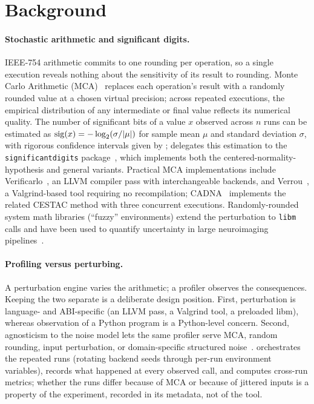 \section{Background}
\label{sec:background}

\paragraph{Stochastic arithmetic and significant digits.}
IEEE-754 arithmetic commits to one rounding per operation, so a single
execution reveals nothing about the sensitivity of its result to rounding.
Monte Carlo Arithmetic (MCA)~\citep{parker1997monte} replaces each
operation's result with a randomly rounded value at a chosen virtual
precision; across repeated executions, the empirical distribution of any
intermediate or final value reflects its numerical quality. The number of
significant bits of a value $x$ observed across $n$ runs can be estimated
as $\operatorname{sig}(x) = -\log_2\!\left(\sigma / |\mu|\right)$ for sample mean $\mu$
and standard deviation $\sigma$, with rigorous confidence intervals given
by \citet{sohier2021confidence}; \pyt{} delegates this estimation to the
\texttt{significantdigits} package~\citep{significantdigits}, which
implements both the centered-normality-hypothesis and general variants.
Practical MCA implementations include
Verificarlo~\citep{denis2016verificarlo}, an LLVM compiler pass with
interchangeable backends, and Verrou~\citep{fevotte2017verrou}, a
Valgrind-based tool requiring no recompilation; CADNA~\citep{jezequel2008cadna}
implements the related CESTAC method with three concurrent executions.
Randomly-rounded system math libraries (``fuzzy'' environments) extend the
perturbation to \texttt{libm} calls and have been used to quantify
uncertainty in large neuroimaging pipelines~\citep{kiar2021comparing}.

\paragraph{Profiling versus perturbing.}
A perturbation engine varies the arithmetic; a profiler observes the
consequences. Keeping the two separate is a deliberate design position.
First, perturbation is language- and ABI-specific (an LLVM pass, a
Valgrind tool, a preloaded libm), whereas observation of a Python program
is a Python-level concern. Second, agnosticism to the noise model lets the
same profiler serve MCA, random rounding, input perturbation, or
domain-specific structured noise~\citep{chatelain2023pytracer}. \pyt{}
orchestrates the repeated runs (rotating backend seeds through per-run
environment variables), records what happened at every observed call,
and computes cross-run metrics; whether the runs differ because of MCA or
because of jittered inputs is a property of the experiment, recorded in
its metadata, not of the tool.

